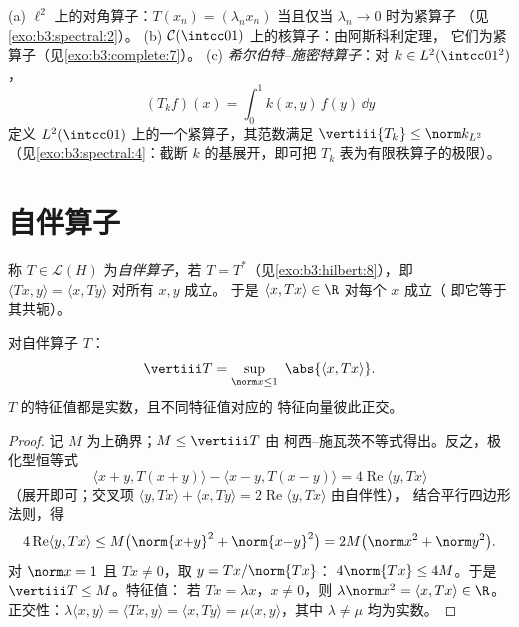 \begin{example}\label{ex:b3:spectral:examples}
(a) $\ell^2$ 上的对角算子：$T(x_n) = (\lambda_nx_n)$
当且仅当 $\lambda_n \to 0$ 时为紧算子
（见\cref{exo:b3:spectral:2}）。
(b) $\mathcal C(\intcc01)$ 上的核算子：由阿斯科利定理，
它们为紧算子（见\cref{exo:b3:complete:7}）。
(c) \emph{希尔伯特–施密特算子}：对 $k \in L^2(\intcc01^2)$，
\[
(T_kf)(x) = \int_0^1k(x, y)\,f(y)\,\dd y
\]
定义 $L^2(\intcc01)$ 上的一个紧算子，其范数满足
$\vertiii{T_k} \leq \norm k_{L^2}$
（见\cref{exo:b3:spectral:4}：截断
$k$ 的基展开，即可把 $T_k$ 表为有限秩算子的极限）。
\end{example}

\section{自伴算子}

\begin{definition}\label{def:b3:spectral:selfadjoint}
称 $T \in \mathcal L(H)$ 为\emph{自伴算子}，若 $T = T^*$（见\cref{exo:b3:hilbert:8}），即
$\langle Tx, y\rangle = \langle x, Ty\rangle$ 对所有 $x, y$ 成立。
于是 $\langle x, Tx\rangle \in \R$ 对每个 $x$ 成立（
即它等于其共轭）。
\end{definition}

\begin{proposition}\label{prop:b3:spectral:sanorm}
对自伴算子 $T$：
\[
\vertiii T = \sup_{\norm x \leq 1}\ \abs{\langle x,
Tx\rangle} .
\]
$T$ 的特征值都是实数，且不同特征值对应的
特征向量彼此正交。
\end{proposition}

\begin{proof}
记 $M$ 为上确界；$M \leq \vertiii T$ 由
柯西–施瓦茨不等式得出。反之，极化型恒等式
\[
\langle x{+}y, T(x{+}y)\rangle - \langle x{-}y,
T(x{-}y)\rangle = 4\operatorname{Re}\langle y, Tx\rangle
\]
（展开即可；交叉项 $\langle y, Tx\rangle + \langle x,
Ty\rangle = 2\operatorname{Re}\langle y, Tx\rangle$ 由自伴性），
结合平行四边形法则，得
\[
4\operatorname{Re}\langle y, Tx\rangle \leq
M\bigl(\norm{x{+}y}^2 + \norm{x{-}y}^2\bigr) = 2M\bigl(\norm
x^2 + \norm y^2\bigr).
\]
对 $\norm x = 1$ 且 $Tx \neq 0$，取 $y = Tx/\norm{Tx}$：
$4\norm{Tx} \leq 4M$。于是 $\vertiii T \leq M$。特征值：
若 $Tx = \lambda x$，$x \ne 0$，则 $\lambda\norm x^2 = \langle
x, Tx\rangle \in \R$。正交性：$\lambda\langle x,
y\rangle = \langle Tx, y\rangle = \langle x, Ty\rangle =
\mu\langle x, y\rangle$，其中 $\lambda \neq \mu$ 均为实数。
\end{proof}

